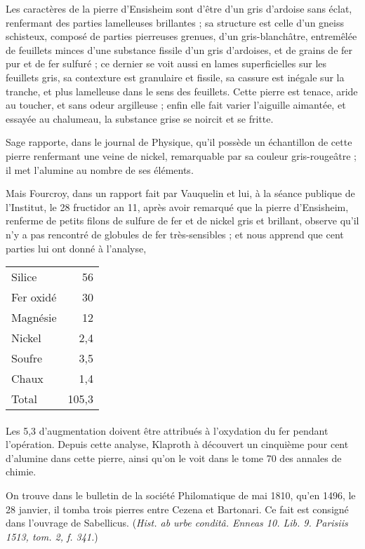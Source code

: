 \documentclass[a4paper, 12pt, oneside, french]{article}
\begin{document}
Les caractères de la pierre d'Ensisheim sont d'être d'un gris d'ardoise sans éclat, renfermant des parties lamelleuses brillantes ; sa structure est celle d'un gneiss schisteux, composé de parties pierreuses grenues, d'un gris-blanchâtre, entremêlée de feuillets minces d'une substance fissile d'un gris d'ardoises, et de grains de fer pur et de fer sulfuré ; ce dernier se voit aussi en lames superficielles sur les feuillets gris, sa contexture est granulaire et fissile, sa cassure est inégale sur la tranche, et plus lamelleuse dans le sens des feuillets. Cette pierre est tenace, aride au toucher, et sans odeur argilleuse ; enfin elle fait varier l'aiguille aimantée, et essayée au chalumeau, la substance grise se noircit et se fritte.

Sage rapporte, dans le journal de Physique, qu'il possède un échantillon de cette pierre renfermant une veine de nickel, remarquable par sa couleur gris-rougeâtre ; il met l'alumine au nombre de ses éléments.

Mais Fourcroy, dans un rapport fait par Vauquelin et lui, à la séance publique de l'Institut, le 28 fructidor an 11, après avoir remarqué que la pierre d'Ensisheim, renferme de petits filons de sulfure de fer et de nickel gris et brillant, observe qu'il n'y a pas rencontré de globules de fer très-sensibles ; et nous apprend que cent parties lui ont donné à l'analyse,
\begin{table}[H]
    \centering
    \Fontauri
    \large
    \begin{tabular}{l r}
        Silice & 56 \\
        Fer oxidé & 30 \\
        Magnésie & 12 \\
        Nickel & 2,4 \\
        Soufre & 3,5 \\
        Chaux & 1,4 \\ \hline
        Total & 105,3 \\
    \end{tabular}
\end{table}
\paragraph{}
Les 5,3 d'augmentation doivent être attribués à l'oxydation du fer pendant l'opération. Depuis cette analyse, Klaproth à découvert un cinquième pour cent d'alumine dans cette pierre, ainsi qu'on le voit dans le tome 70 des annales de chimie.

On trouve dans le bulletin de la société Philomatique de mai 1810, qu'en 1496, le 28 janvier, il tomba trois pierres entre Cezena et Bartonari. Ce fait est consigné dans l'ouvrage de Sabellicus. (\emph{Hist. ab urbe conditâ. Enneas 10. Lib. 9. Parisiis 1513, tom. 2, f. 341.})
\end{document}
